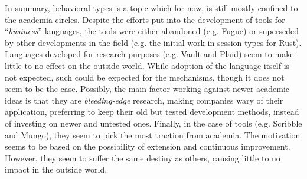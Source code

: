In summary, behavioral types is a topic which for now, is still mostly confined to the academia circles.
Despite the efforts put into the development of tools for “\emph{business}” languages,
the tools were either abandoned (e.g. Fugue) or
superseded by other developments in the field (e.g. the initial work in session types for Rust).
Languages developed for research purposes (e.g. Vault and Plaid) seem to make little to no effect on the outside world.
While adoption of the language itself is not expected, such could be expected for the mechanisms,
though it does not seem to be the case.
Possibly, the main factor working against newer academic ideas is that they are \emph{bleeding-edge} research,
making companies wary of their application, preferring to keep their old but tested development methods,
instead of investing on newer and untested ones.
Finally, in the case of tools (e.g. Scribble and Mungo), they seem to pick the most traction from academia.
The motivation seems to be based on the possibility of extension and continuous improvement.
However, they seem to suffer the same destiny as others, causing little to no impact in the outside world.